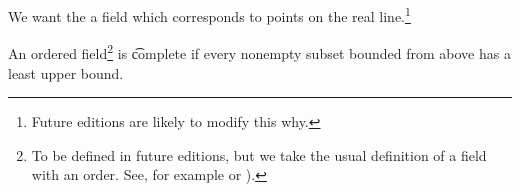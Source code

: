 

We want the a field which corresponds to points on the real line.\footnote{Future editions are likely to modify this why.}


An ordered field\footnote{To be defined in future editions, but we take the usual definition of a field with an order. See, for example  or ).} is \t{complete} if every nonempty subset bounded from above has a least upper bound.

\blankpage
